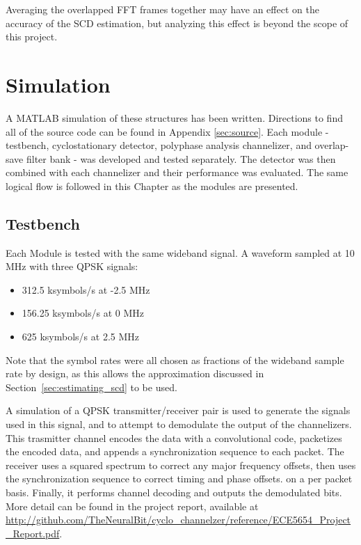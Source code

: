\documentclass[12pt]{report}
\begin{document}
Averaging the overlapped FFT frames together may have an effect on the accuracy
of the SCD estimation, but analyzing this effect is beyond the scope of this
project.

\chapter{Simulation}
\label{sec:sim}
A MATLAB simulation of these structures has been written. Directions to find
all of the source code can be found in Appendix \ref{sec:source}. Each module
- testbench, cyclostationary detector, polyphase analysis channelizer, and
overlap-save filter bank - was developed and tested separately. The detector
was then combined with each channelizer and their performance was evaluated.
The same logical flow is followed in this Chapter as the modules are presented.

\section{Testbench}
Each Module is tested with the same wideband signal. A waveform sampled at 10 MHz with three QPSK signals:
\begin{itemize}
    \item{312.5 ksymbols/s at -2.5 MHz}
    \item{156.25 ksymbols/s at 0 MHz}
    \item{625 ksymbols/s at 2.5 MHz}
\end{itemize}
Note that the symbol rates were all chosen as fractions of the wideband sample
rate by design, as this allows the approximation discussed in
Section~\ref{sec:estimating_scd} to be used.

A simulation of a QPSK transmitter/receiver pair is used to generate the
signals used in this signal, and to attempt to demodulate the output of the
channelizers. This trasmitter channel encodes the data with a convolutional
code, packetizes the encoded data, and appends a synchronization sequence to
each packet. The receiver uses a squared spectrum to correct any major
frequency offsets, then uses the synchronization sequence to correct timing and
phase offsets. on a per packet basis. Finally, it performs channel decoding and
outputs the demodulated bits. More detail can be found in the project report, available at
\url{http://github.com/TheNeuralBit/cyclo_channelzer/reference/ECE5654_Project_Report.pdf}.
\end{document}
